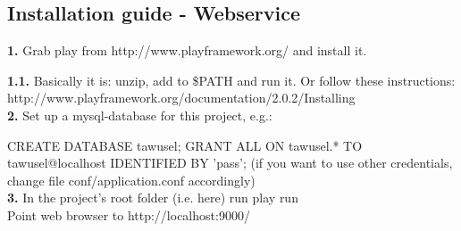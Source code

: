 \subsection{Installation guide - Webservice}\label{ssec:WebInst}

\textbf{1.} Grab play from http://www.playframework.org/ and install it.

\textbf{1.1.} Basically it is: unzip, add to \$PATH and run it. Or follow these instructions:
http://www.playframework.org/documentation/2.0.2/Installing\\
\textbf{2.} Set up a mysql-database for this project, e.g.:

CREATE DATABASE tawusel; GRANT ALL ON tawusel.* TO tawusel@localhost IDENTIFIED BY 'pass'; (if you want to use other credentials,
change file conf/application.conf accordingly)\\
\textbf{3.} In the project's root folder (i.e. here) run play run\\

Point web browser to http://localhost:9000/